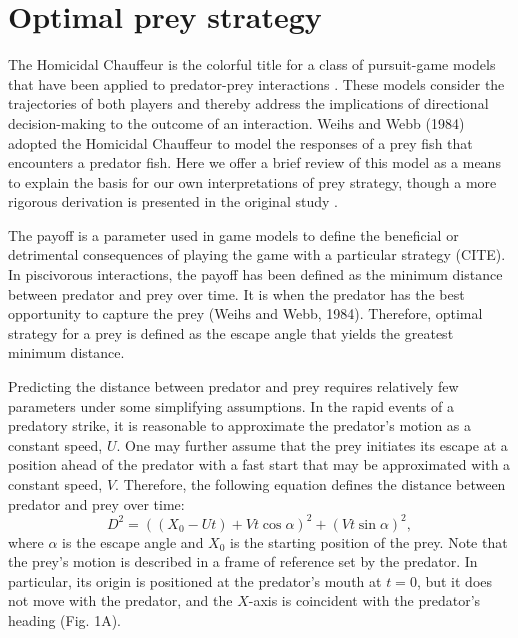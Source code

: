 \documentclass[12pt]{article}
\begin{document}
\section{Optimal prey strategy}

The Homicidal Chauffeur is the colorful title for a class of pursuit-game models that have been applied to predator-prey interactions \citep{Isaacs:1965va}. These models consider the trajectories of both players and thereby address the implications of directional decision-making to the outcome of an interaction. Weihs and Webb (1984) adopted the Homicidal Chauffeur to model the responses of a prey fish that encounters a predator fish. Here we offer a brief review of this model as a means to explain the basis for our own interpretations of prey strategy, though a more rigorous derivation is presented in the original study \citep{Weihs:1984tb}.

The payoff is a parameter used in game models to define the beneficial or detrimental consequences of playing the game with a particular strategy (CITE). In piscivorous interactions, the payoff has been defined as the minimum distance between predator and prey over time. It is when the predator has the best opportunity to capture the prey (Weihs and Webb, 1984). Therefore, optimal strategy for a prey is defined as the escape angle that yields the greatest minimum distance.

Predicting the distance between predator and prey requires relatively few parameters under some simplifying assumptions. In the rapid events of a predatory strike, it is reasonable to approximate the predator's motion as a constant speed, $U$. One may further assume that the prey initiates its escape at a position ahead of the predator with a fast start that may be approximated with a constant speed, $V$. Therefore, the following equation defines the distance between predator and prey over time:
%
\begin{equation}
D^2 = ((X_0 - Ut) + Vt\cos\alpha)^2 + (Vt\sin\alpha)^2,
\label{dist}
\end{equation}
%
where $\alpha$ is the escape angle and $X_0$ is the starting position of the prey. Note that the prey's motion is described in a frame of reference set by the predator. In particular, its origin is positioned at the predator's mouth at $t= 0$, but it does not move with the predator, and the $X$-axis is coincident with the predator's heading (Fig. 1A). 
\end{document}
